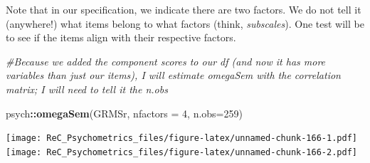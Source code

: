 \documentclass[
  english,
]{book}
\newenvironment{Shaded}{\begin{snugshade}}{\end{snugshade}}
\newcommand{\CommentTok}[1]{\textcolor[rgb]{0.56,0.35,0.01}{\textit{#1}}}
\newcommand{\DataTypeTok}[1]{\textcolor[rgb]{0.13,0.29,0.53}{#1}}
\newcommand{\DecValTok}[1]{\textcolor[rgb]{0.00,0.00,0.81}{#1}}
\newcommand{\KeywordTok}[1]{\textcolor[rgb]{0.13,0.29,0.53}{\textbf{#1}}}
\newcommand{\NormalTok}[1]{#1}
\newcommand{\OperatorTok}[1]{\textcolor[rgb]{0.81,0.36,0.00}{\textbf{#1}}}
\begin{document}
Note that in our specification, we indicate there are two factors. We do not tell it (anywhere!) what items belong to what factors (think, \emph{subscales}). One test will be to see if the items align with their respective factors.

\begin{Shaded}
\begin{Highlighting}[]
\CommentTok{#Because we added the component scores to our df (and now it has more variables than just our items), I will estimate omegaSem with the correlation matrix; I will need to tell it the n.obs}

\NormalTok{psych}\OperatorTok{::}\KeywordTok{omegaSem}\NormalTok{(GRMSr, }\DataTypeTok{nfactors =} \DecValTok{4}\NormalTok{, }\DataTypeTok{n.obs=}\DecValTok{259}\NormalTok{)}
\end{Highlighting}
\end{Shaded}

\texttt{[image: ReC\_Psychometrics\_files/figure-latex/unnamed-chunk-166-1.pdf]} \texttt{[image: ReC\_Psychometrics\_files/figure-latex/unnamed-chunk-166-2.pdf]}
\end{document}
